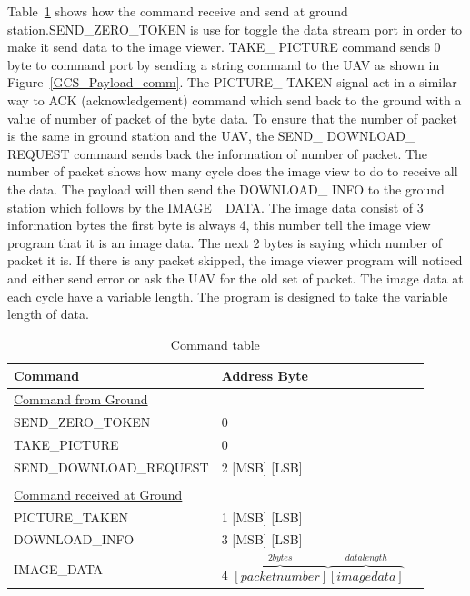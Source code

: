 \documentclass[oneside]{ecsgdp}         %
\begin{document}
Table~\ref{command_table} shows how the command receive and send at ground station.SEND\_ZERO\_TOKEN is use for toggle the data stream port in order to make it send data to the image viewer. TAKE\_ PICTURE command sends 0 byte to command port by sending a string command to the UAV as shown in Figure~\ref{GCS_Payload_comm}. The PICTURE\_ TAKEN signal act in a similar way to ACK (acknowledgement) command which send back to the ground with a value of number of packet of the byte data. To ensure that the number of packet is the same in ground station and the UAV, the SEND\_ DOWNLOAD\_ REQUEST command sends back the information of number of packet. The number of packet shows how many cycle does the image view to do to receive all the data.  The payload will then send the DOWNLOAD\_ INFO to the ground station which follows by the IMAGE\_ DATA. The image data consist of 3 information bytes the first byte is always 4, this number tell the image view program that it is an image data. The next 2 bytes is saying which number of packet it is. If there is any packet skipped, the image viewer program will noticed and either send error or ask the UAV for the old set of packet. The image data at each cycle have a variable length. The program is designed to take the variable length of data.

\begin{table}[!htbp]

\begin{center}
\begin{tabular}{l l @{.} l}
 Command&
\multicolumn{2}{l}{Address Byte } \\

\hline
\underline{Command from Ground} & \\
SEND\_ZERO\_TOKEN & 0 \\
TAKE\_PICTURE & 0 \\
SEND\_DOWNLOAD\_REQUEST & 2 [MSB] [LSB]  \\
\\
\underline{Command received at Ground}\\
PICTURE\_TAKEN & 1 [MSB] [LSB]\\
DOWNLOAD\_INFO & 3 [MSB] [LSB]\\
IMAGE\_DATA & 4 $\overbrace{ [packet number]}^{2bytes} \overbrace{[image data]}^{data length}$ \\
\end{tabular}
\caption{Command table\label{command_table}}
\end{center}
\end{table}
\end{document}
